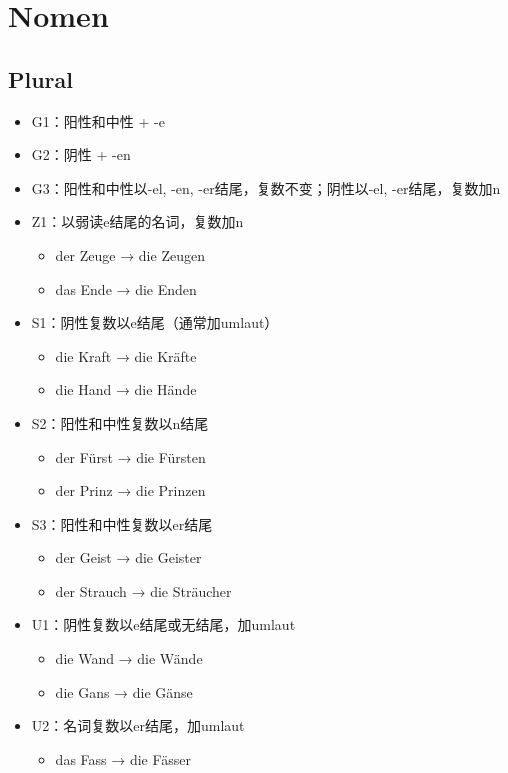 \documentclass[UTF8]{report}
\begin{document}
\chapter{Nomen}
\section{Plural}
\begin{itemize}
    \item G1：阳性和中性 + -e
    \item G2：阴性 + -en
    \item G3：阳性和中性以-el, -en, -er结尾，复数不变；阴性以-el, -er结尾，复数加n
    \item Z1：以弱读e结尾的名词，复数加n
    \begin{itemize}
        \item der Zeuge → die Zeugen
        \item das Ende → die Enden
    \end{itemize}
    \item S1：阴性复数以e结尾（通常加umlaut）
    \begin{itemize}
        \item die Kraft → die Kräfte
        \item die Hand → die Hände
    \end{itemize}
    \item S2：阳性和中性复数以n结尾
    \begin{itemize}
        \item der Fürst → die Fürsten
        \item der Prinz → die Prinzen
    \end{itemize}
    \item S3：阳性和中性复数以er结尾
    \begin{itemize}
        \item der Geist → die Geister
        \item der Strauch → die Sträucher
    \end{itemize}
    \item U1：阴性复数以e结尾或无结尾，加umlaut
    \begin{itemize}
        \item die Wand → die Wände
        \item die Gans → die Gänse
    \end{itemize}
    \item U2：名词复数以er结尾，加umlaut
    \begin{itemize}
        \item das Fass → die Fässer

\end{itemize}
\end{itemize}
\end{document}
